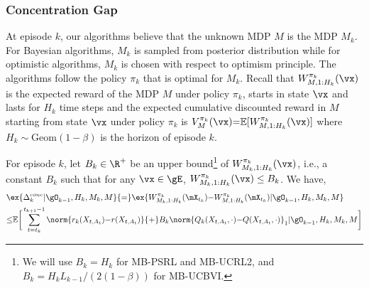 \begin{subappendices}
\subsubsection{Concentration Gap}

At episode $k$, our algorithms believe that the unknown MDP $M$ is the MDP $M_k$.
For Bayesian algorithms, $M_k$ is sampled from posterior distribution while for optimistic algorithms, $M_k$ is chosen with respect to optimism principle.
The algorithms follow the policy $\pi_k$ that is optimal for $M_k$.
Recall that $W^{\pi_k}_{M,1:H_k}(\vx)$ is the expected reward of the MDP $M$ under policy $\pi_k$, starts in state $\vx$ and lasts for $H_k$ time steps and the expected cumulative discounted reward in $M$ starting from state $\vx$ under policy $\pi_k$ is $V_{M}^{\pi_k}(\vx){=}\mathbb{E}[W^{\pi_k}_{M, 1:H_k}(\vx)]$ where $H_k\sim \mathrm{Geom}(1-\beta)$ is the horizon of episode $k$.

\begin{lem}
    \label{lem:regret_decomposition}
    For episode $k$, let $B_k\in\R^+$ be an upper bound\footnote{We will use $B_k=H_k$ for MB-PSRL and MB-UCRL2, and $B_k=H_kL_{k-1}/(2(1-\beta))$ for MB-UCBVI.} of $W_{M_k,1:H_k}^{\pi_k}(\vx)$, i.e., a constant $B_k$ such that for any $\vx\in\gE$, $W_{M_k,1:H_k}^{\pi_k}(\vx)\le B_k$. We have,
    \begin{align}
        \label{eq:lem_decompo}
        &\ex{ \Delta_k^{conc} {\mid} \gO_{k-1}, H_k, M_k, M} {=} \ex{ W_{M_k,1:H_k}^{\pi_k}(\mX_{t_k}){-}W_{M,1:H_k}^{\pi_k}(\mX_{t_k}) {\mid} \gO_{k-1}, H_k, M_k, M}\nonumber \\
        &{\le}\mathbb{E}\bigg[\sum_{t=t_k}^{t_{k+1}-1}\norm{r_k(X_{t,A_t}){-}r(X_{t,A_t})}
        {+}B_k\norm{Q_{k}(X_{t,A_t},\cdot){-}Q(X_{t,A_t},\cdot)}_1 {\mid} \gO_{k-1}, H_k, M_k, M\bigg]
    \end{align}
\end{lem}


\end{subappendices}
